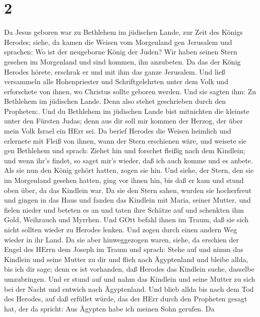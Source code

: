 \hypertarget{section-1}{%
\section{2}\label{section-1}}

 Da Jesus geboren war zu Bethlehem im jüdischen Lande, zur
Zeit des Königs Herodes; siehe, da kamen die Weisen vom Morgenland gen
Jerusalem und sprachen:  Wo ist der neugeborne König der
Juden? Wir haben seinen Stern gesehen im Morgenland und sind kommen, ihn
anzubeten.  Da das der König Herodes hörete, erschrak er und
mit ihm das ganze Jerusalem.  Und ließ versammeln alle
Hohenpriester und Schriftgelehrten unter dem Volk und erforschete von
ihnen, wo Christus sollte geboren werden.  Und sie sagten
ihm: Zu Bethlehem im jüdischen Lande. Denn also stehet geschrieben durch
den Propheten:.  Und du Bethlehem im jüdischen Lande bist
mitnichten die kleinste unter den Fürsten Judas; denn aus dir soll mir
kommen der Herzog, der über mein Volk Israel ein HErr sei. 
Da berief Herodes die Weisen heimlich und erlernete mit Fleiß von ihnen,
wann der Stern erschienen wäre,  und weisete sie gen
Bethlehem und sprach: Ziehet hin und forschet fleißig nach dem Kindlein;
und wenn ihr's findet, so saget mir's wieder, daß ich auch komme und es
anbete.  Als sie nun den König gehört hatten, zogen sie hin.
Und siehe, der Stern, den sie im Morgenland gesehen hatten, ging vor
ihnen hin, bis daß er kam und stund oben über, da das Kindlein war.
 Da sie den Stern sahen, wurden sie hocherfreut
 und gingen in das Haus und fanden das Kindlein mit Maria,
seiner Mutter, und fielen nieder und beteten es an und taten ihre
Schätze auf und schenkten ihm Gold, Weihrauch und Myrrhen. 
Und GOtt befahl ihnen im Traum, daß sie sich nicht sollten wieder zu
Herodes lenken. Und zogen durch einen andern Weg wieder in ihr Land.
 Da sie aber hinweggezogen waren, siehe, da erschien der
Engel des HErrn dem Joseph im Traum und sprach: Stehe auf und nimm das
Kindlein und seine Mutter zu dir und flieh nach Ägyptenland und bleibe
allda, bis ich dir sage; denn es ist vorhanden, daß Herodes das Kindlein
suche, dasselbe umzubringen.  Und er stund auf und nahm das
Kindlein und seine Mutter zu sich bei der Nacht und entwich nach
Ägyptenland.  Und blieb allda bis nach dem Tod des Herodes,
auf daß erfüllet würde, das der HErr durch den Propheten gesagt hat, der
da spricht: Aus Ägypten habe ich meinen Sohn gerufen.  Da

